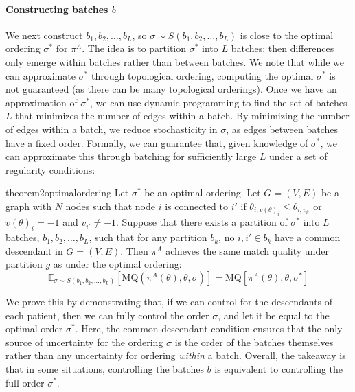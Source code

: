 \documentclass[11pt]{article}
\begin{document}
\paragraph{Constructing batches $b$}
We next construct $b_{1},b_{2},\ldots,b_{L}$, so $\sigma \sim S(b_{1},b_{2},\ldots,b_{L})$ is close to the optimal ordering $\sigma^{*}$ for $\pi^{A}$. 
The idea is to partition $\sigma^{*}$ into $L$ batches; then differences only emerge within batches rather than between batches.
We note that while we can approximate $\sigma^{*}$ through topological ordering, computing the optimal $\sigma^{*}$ is not guaranteed (as there can be many topological orderings). 
Once we have an approximation of $\sigma^{*}$, we can use dynamic programming to find the set of batches $L$ that minimizes the number of edges within a batch. 
By minimizing the number of edges within a batch, we reduce stochasticity in $\sigma$, as edges between batches have a fixed order. 
Formally, we can guarantee that, given knowledge of $\sigma^{*}$, we can approximate this through batching for sufficiently large $L$ under a set of regularity conditions: 
\begin{restatable}{theorem2}{optimalordering}
    Let $\sigma^{*}$ be an optimal ordering.
    Let $G=(V,E)$ be a graph with $N$ nodes such that node $i$ is connected to $i'$ if $\theta_{i,v(\theta)_{i}} \leq \theta_{i,v_{i'}}$ or $v(\theta)_{i} = -1$ and $v_{i'} \neq -1$. 
    Suppose that there exists a partition of $\sigma^{*}$ into $L$ batches, $b_{1},b_{2},\ldots,b_{L}$, such that for any partition $b_{k}$, no $i, i' \in b_{k}$ have a common descendant in $G=(V,E)$. 
    Then $\pi^{A}$ achieves the same match quality under partition $g$  as under the optimal ordering: 
    \begin{equation}
        \mathbb{E}_{\sigma \sim S(b_{1},b_{2},\ldots,b_{L})}[\mathrm{MQ}(\pi^{A}(\theta),\theta,\sigma)] = \mathrm{MQ}[\pi^{A}(\theta),\theta,\sigma^{*}] 
    \end{equation}
\end{restatable}
We prove this by demonstrating that, if we can control for the descendants of each patient, then we can fully control the order $\sigma$, and let it be equal to the optimal order $\sigma^{*}$. 
Here, the common descendant condition ensures that the only source of uncertainty for the ordering $\sigma$ is the order of the batches themselves rather than any uncertainty for ordering \textit{within} a batch. 
Overall, the takeaway is that in some situations, controlling the batches $b$ is equivalent to controlling the full order $\sigma^{*}$. 
\end{document}
